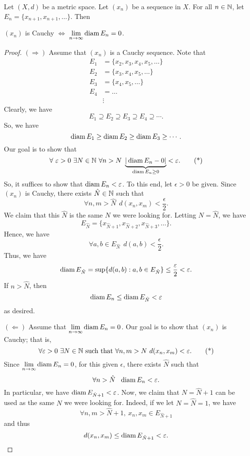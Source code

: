 \documentclass[a4paper]{article}
\begin{document}
\begin{theorem}
   Let \( (X,d) \) be a metric space. Let \( ({x}_{n}) \) be a sequence in \( X  \). For all \( n \in \mathbb{N}  \), let \( {E}_{n} = \{ {x}_{n+1}, {x}_{n+1}, \dots  \}  \). Then 
   \begin{center}
       \( ({x}_{n})  \) is Cauchy \( \iff  \) \( \lim_{ n \to \infty  }  \diam {E}_{n} = 0  \).
   \end{center}
\end{theorem}
\begin{proof}
\( ( \Longrightarrow ) \) Assume that \( ({x}_{n}) \) is a Cauchy sequence. Note that 
\begin{align*}
    {E}_{1} &= \{ {x}_{2}, {x}_{3}, {x}_{4}, {x}_{5}, \dots  \}  \\
    {E}_{2} &= \{ {x}_{3}, {x}_{4}, {x}_{5}, \dots  \}  \\
    {E}_{3}  &= \{ {x}_{4}, {x}_{5}, \dots  \}  \\
    {E}_{4} &= \dots \\
            &\vdots
\end{align*}
Clearly, we have 
\[  {E}_{1} \supseteq {E}_{2} \supseteq {E}_{3} \supseteq {E}_{4} \supseteq \cdots .  \]
So, we have 
\[  \operatorname{diam} {E}_{1} \geq \operatorname{diam} {E}_{2} \geq \operatorname{diam} {E}_{3} \geq \cdots . \]
Our goal is to show that 
\[  \forall \ \varepsilon > 0 \ \exists N \in \mathbb{N} \ \forall n > N \ \underbrace{| \operatorname{diam} {E}_{n} - 0 |}_{\operatorname{diam} {E}_{n} \geq 0}  < \varepsilon. \tag{*} \]
So, it suffices to show that \( \operatorname{diam} {E}_{n} < \varepsilon \). To this end, let \( \epsilon > 0  \) be given. Since \( ({x}_{n}) \) is Cauchy, there exists \( \hat{N} \in \mathbb{N} \) such that 
\[  \forall n,m > \hat{N} \ \ d({x}_{n}, {x}_{m}) < \frac{ \epsilon }{ 2 }. \]
We claim that this \( \hat{N} \) is the same \( N  \) we were looking for. Letting \( N = \hat{N} \), we have 
\[  {E}_{\hat{N}} = \{ {x}_{\hat{N} + 1} , {x}_{\hat{N} + 2}, {x}_{\hat{N} + 3}, \dots  \}. \]
Hence, we have
\[  \forall a,b \in {E}_{\hat{N}} \ \ d(a,b) < \frac{ \epsilon }{ 2 }. \]
Thus, we have 
\[  \operatorname{diam} {E}_{\hat{N}} = \sup \{ d(a,b) : a,b \in {E}_{\hat{N}} \} \leq \frac{ \varepsilon }{ 2 }  < \varepsilon. \]
If \( n > \hat{N} \), then
\[  \operatorname{diam} {E}_{n} \leq \operatorname{diam} {E}_{\hat{N}} < \varepsilon \]
as desired.

\( (\Longleftarrow) \) Assume that \( \lim_{ n \to \infty  }  \diam {E}_{n} = 0  \). Our goal is to show that \( ({x}_{n}) \) is Cauchy; that is, 
\[  \forall \varepsilon > 0 \ \exists N \in \mathbb{N} \ \text{such that} \ \forall n,m > N \ d({x}_{n}, {x}_{m}) < \varepsilon. \tag{*} \]
Since \( \lim_{ n \to  \infty  }  \diam {E}_{n} = 0 \), for this given \( \epsilon \), there exists \( \hat{N} \) such that 
\[  \forall n > \hat{N} \ \ \operatorname{diam} {E}_{n} < \varepsilon. \]
In particular, we have \( \operatorname{diam} {E}_{\hat{N} + 1} < \varepsilon \).
Now, we claim that \( N = \hat{N} + 1  \) can be used as the same \( N  \) we were looking for. Indeed, if we let \( N = \hat{N} = 1 \), we have
\[  \forall n,m > \hat{N} + 1 , \ {x}_{n}, {x}_{m} \in {E}_{\hat{N} +1}  \]
and thus
\[  d({x}_{n}, {x}_{m}) \leq \operatorname{diam} {E}_{\hat{N} + 1} < \varepsilon. \]
\end{proof}
\end{document}
